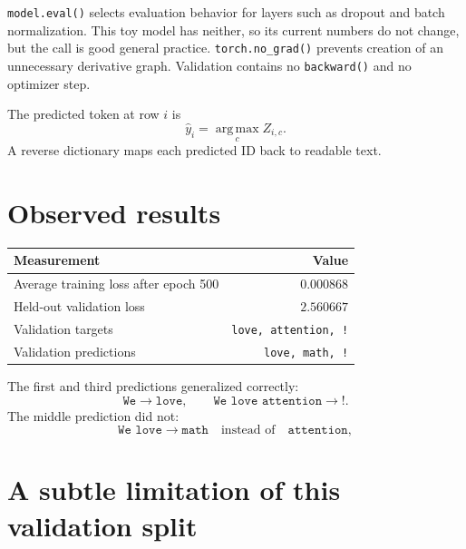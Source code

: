 \documentclass[11pt]{article}
\newcommand{\argmax}{\operatorname*{arg\,max}}
\begin{document}
\texttt{model.eval()} selects evaluation behavior for layers such as dropout and batch normalization. This toy
model has neither, so its current numbers do not change, but the call is good general practice.
\texttt{torch.no\_grad()} prevents creation of an unnecessary derivative graph. Validation contains no
\texttt{backward()} and no optimizer step.

The predicted token at row $i$ is
\[
\widehat y_i=\argmax_c Z_{i,c}.
\]
A reverse dictionary maps each predicted ID back to readable text.

\section{Observed results}

\begin{center}
\begin{tabular}{lr}
\toprule
Measurement & Value\\
\midrule
Average training loss after epoch 500 & $0.000868$\\
Held-out validation loss & $2.560667$\\
Validation targets & \texttt{love, attention, !}\\
Validation predictions & \texttt{love, math, !}\\
\bottomrule
\end{tabular}
\end{center}

The first and third predictions generalized correctly:
\[
\texttt{We}\longrightarrow\texttt{love},
\qquad
\texttt{We love attention}\longrightarrow\texttt{!}.
\]
The middle prediction did not:
\[
\texttt{We love}\longrightarrow\texttt{math}
\quad\text{instead of}\quad\texttt{attention},
\]

\begin{center}
\end{center}

\section{A subtle limitation of this validation split}
\end{document}
